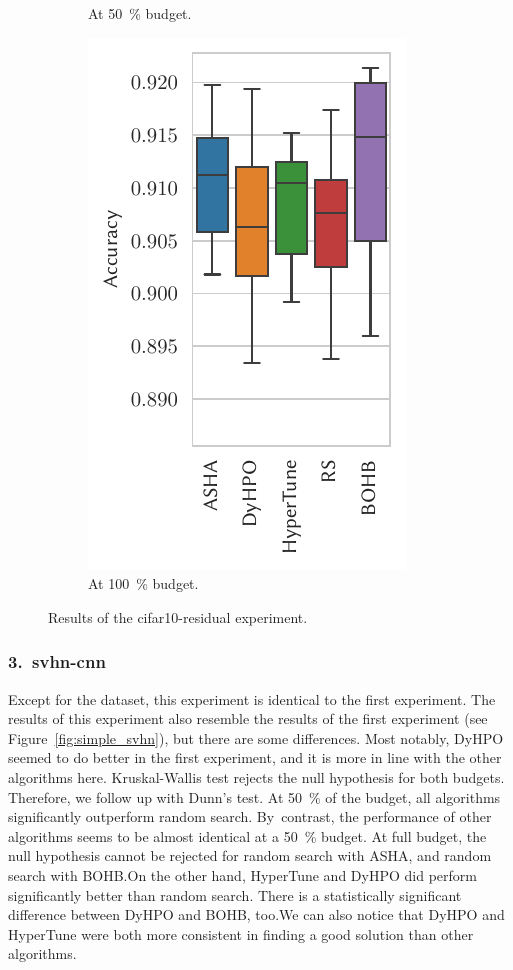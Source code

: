 \begin{figure}[H]
\begin{subfigure}{.26\textwidth}
        \caption{At \SI{50}{\percent} budget.}%
    \end{subfigure}%
    \begin{subfigure}{.26\textwidth}
        \includegraphics[height=\plotheight]{img/real_exp/cifar10_residual_boxplot_full.pdf}%
        \caption{At \SI{100}{\percent} budget.}%
    \end{subfigure}%
\caption{Results of the cifar10-residual experiment.}
\label{fig:resnet_cifar10}
\end{figure}

\subsubsection{3.\ svhn-cnn}
Except for the dataset, this experiment is identical to the first experiment. The results of this experiment also resemble the results of the first experiment (see Figure~\ref{fig:simple_svhn}), but there are some differences. Most notably, DyHPO seemed to do better in the first experiment, and it is more in line with the other algorithms here. Kruskal-Wallis test rejects the null hypothesis for both budgets. Therefore, we follow up with Dunn's test. At \SI{50}{\percent} of the budget, all algorithms significantly outperform random search. By~contrast, the performance of other algorithms seems to be almost identical at a \SI{50}{\percent} budget. At full budget, the null hypothesis cannot be rejected for random search with ASHA, and random search with BOHB.\@ On the other hand, HyperTune and DyHPO did perform significantly better than random search. There is a statistically significant difference between DyHPO and BOHB, too.\@ We can also notice that DyHPO and HyperTune were both more consistent in finding a good solution than other algorithms.

